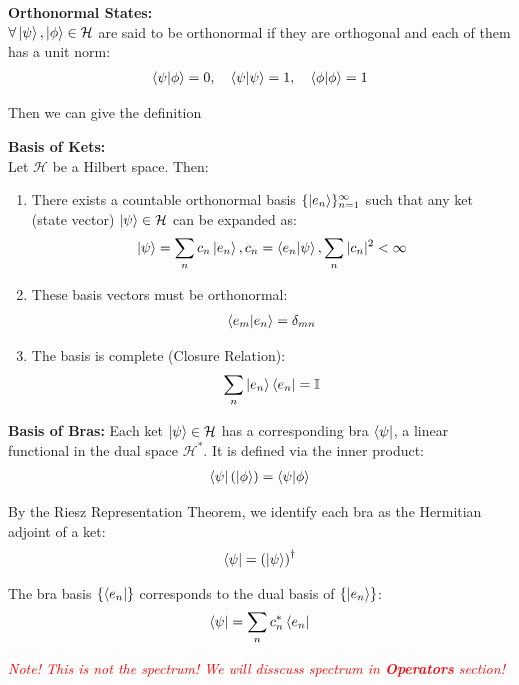 \begin{definition}{\textbf{Orthonormal States:}}
    \\
    $\forall \ket{\psi},\ket{\phi} \in \mathcal{H}$ are said to be orthonormal if they are orthogonal and each of them has a unit norm:
    \begin{eqnarray}
        \braket{\psi|\phi} = 0, \quad \braket{\psi|\psi}=1, \quad \braket{\phi|\phi} = 1
    \end{eqnarray}
\end{definition}
Then we can give the definition
\begin{definition}{\textbf{Basis of Kets:}}\label{def:basis_ket}
    \\
    Let $\mathcal{H}$ be a Hilbert space. Then:
\begin{enumerate}
    \item There exists a countable orthonormal basis $\{ \ket{e_n} \}_{n=1}^\infty$ such that any ket (state vector) $\ket{\psi} \in \mathcal{H}$ can be expanded as:
    \begin{eqnarray}
    \ket{\psi} = \sum_n c_n \ket{e_n}, 
    c_n = \braket{e_n | \psi}, 
    \sum_n |c_n|^2 < \infty \label{eq:decompositions_ket}
    \end{eqnarray}
    
    \item These basis vectors must be orthonormal:
    \begin{eqnarray}
    \braket{e_m | e_n} = \delta_{mn}
    \end{eqnarray}
    
    \item The basis is complete (Closure Relation):
    \begin{eqnarray}
    \sum_n \ket{e_n}\bra{e_n} = \mathbb{I} \label{eq:closure_relation}
    \end{eqnarray}
\end{enumerate}
\end{definition}
\begin{definition}{\textbf{Basis of Bras:}}
    Each ket $\ket{\psi} \in \mathcal{H}$ has a corresponding bra $\bra{\psi}$, a linear functional in the dual space $\mathcal{H}^*$. It is defined via the inner product:
\begin{eqnarray}
\bra{\psi}(\ket{\phi}) = \braket{\psi | \phi}
\end{eqnarray}

By the Riesz Representation Theorem, we identify each bra as the Hermitian adjoint of a ket:
\begin{eqnarray}
\bra{\psi} = \left( \ket{\psi} \right)^\dagger
\end{eqnarray}

The bra basis $\{ \bra{e_n} \}$ corresponds to the dual basis of $\{ \ket{e_n} \}$:
\begin{eqnarray}
\bra{\psi} = \sum_n c_n^* \bra{e_n} \label{eq:decompositions_bra}
\end{eqnarray}
\end{definition}
\emph{\textcolor{red}{Note! This is not the spectrum! We will disscuss spectrum in \textbf{Operators} section!}}

